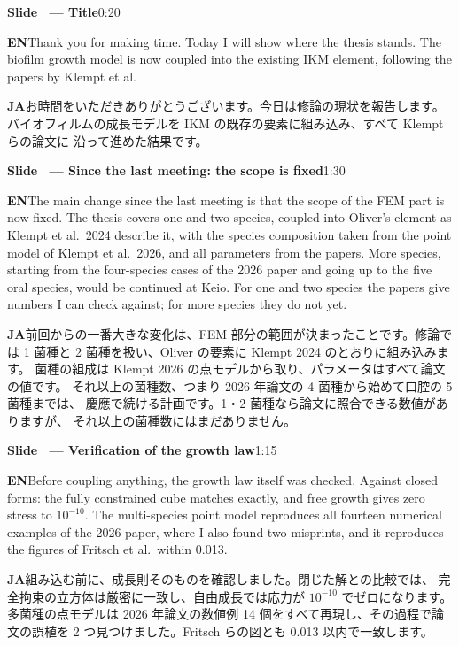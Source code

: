 \documentclass[11pt,a4paper]{article}
\newcounter{sl}
\newcommand{\slide}[2]{\stepcounter{sl}\vspace{8pt}%
  {\color{c3}\large\bfseries Slide \thesl\ --- #1}\hfill{\small #2}\par\vspace{2pt}}
\newcommand{\EN}{\textbf{EN}\quad}
\newcommand{\JA}{\par\textbf{JA}\quad}
\begin{document}
\slide{Title}{0:20}
\EN Thank you for making time. Today I will show where the thesis stands.
The biofilm growth model is now coupled into the existing IKM element,
following the papers by Klempt et al.
\JA お時間をいただきありがとうございます。今日は修論の現状を報告します。
バイオフィルムの成長モデルを IKM の既存の要素に組み込み、すべて Klempt らの論文に
沿って進めた結果です。

\slide{Since the last meeting: the scope is fixed}{1:30}
\EN The main change since the last meeting is that the scope of the FEM part
is now fixed. The thesis covers one and two species, coupled into Oliver's
element as Klempt et al.\ 2024 describe it, with the species
composition taken from the point model of Klempt et al.\ 2026, and all
parameters from the papers. More species, starting from the four-species
cases of the 2026 paper and going up to the five oral species, would be continued
at Keio. For one and two species the papers give numbers I can check
against; for more species they do not yet.
\JA 前回からの一番大きな変化は、FEM 部分の範囲が決まったことです。修論では
1 菌種と 2 菌種を扱い、Oliver の要素に Klempt 2024 のとおりに組み込みます。
菌種の組成は Klempt 2026 の点モデルから取り、パラメータはすべて論文の値です。
それ以上の菌種数、つまり 2026 年論文の 4 菌種から始めて口腔の 5 菌種までは、
慶應で続ける計画です。1・2 菌種なら論文に照合できる数値がありますが、
それ以上の菌種数にはまだありません。

\slide{Verification of the growth law}{1:15}
\EN Before coupling anything, the growth law itself was checked. Against closed
forms: the fully constrained cube matches exactly, and free growth gives zero
stress to $10^{-10}$. The multi-species point model reproduces all fourteen numerical
examples of the 2026 paper, where I also found two misprints, and it
reproduces the figures of Fritsch et al.\ within 0.013.
\JA 組み込む前に、成長則そのものを確認しました。閉じた解との比較では、
完全拘束の立方体は厳密に一致し、自由成長では応力が $10^{-10}$ でゼロになります。
多菌種の点モデルは 2026 年論文の数値例
14 個をすべて再現し、その過程で論文の誤植を 2 つ見つけました。Fritsch らの図とも
0.013 以内で一致します。
\end{document}
